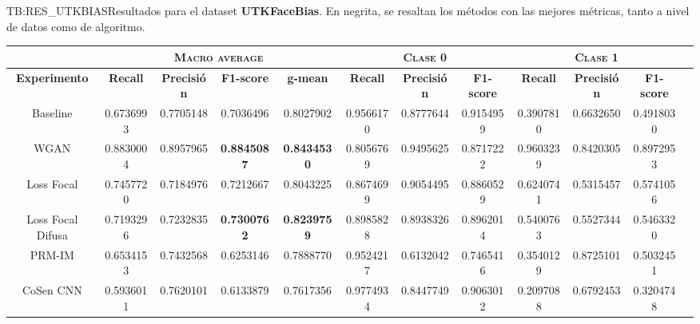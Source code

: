 \begin{landscape}
\begin{table}[Resultados UTKFaceBias]{TB:RES_UTKBIAS}{Resultados para el dataset \textbf{UTKFaceBias}. En negrita, se resaltan los métodos con las mejores métricas, tanto a nivel de datos como de algoritmo.}
    \small
    \begin{tabular}{|c|c|c|c|c|c|c|c|c|c|c|c|}
    \hline
         &  \multicolumn{4}{c|}{\textsc{Macro average}} & \multicolumn{3}{c|}{\textsc{Clase 0}} & \multicolumn{3}{c|}{\textsc{Clase 1}}\\ \hline
        \textbf{Experimento} & \textbf{Recall} & \textbf{Precisión} & \textbf{F1-score} & \textbf{g-mean} & \textbf{Recall} & \textbf{Precisión} & \textbf{F1-score} & \textbf{Recall} & \textbf{Precisión} & \textbf{F1-score} \\ \hline
        Baseline & 0.6736993 & 0.7705148 & 0.7036496 & 0.8027902 & 0.9566170 & 0.8777644 & 0.9154959 & 0.3907810 & 0.6632650 & 0.4918030 \\ \hline
        WGAN & 0.8830004 & 0.8957965 & \textbf{0.8845087} & \textbf{0.8434530} & 0.8056769 & 0.9495625 & 0.8717222 & 0.9603239 & 0.8420305 & 0.8972953 \\ \hline
        Loss Focal & 0.7457720 & 0.7184976 & 0.7212667 & 0.8043225 & 0.8674699 & 0.9054495 & 0.8860529 & 0.6240741 & 0.5315457 & 0.5741056 \\ \hline
        Loss Focal Difusa & 0.7193296 & 0.7232835 & \textbf{0.7300762} & \textbf{0.8239759} & 0.8985828 & 0.8938326 & 0.8962014 & 0.5400763 & 0.5527344 & 0.5463320 \\ \hline
        PRM-IM & 0.6534153 & 0.7432568 & 0.6253146 & 0.7888770 & 0.9524217 & 0.6132042 & 0.7465416 & 0.3540129 & 0.8725101 & 0.5032451 \\ \hline
        CoSen CNN & 0.5936011 & 0.7620101 & 0.6133879 & 0.7617356 & 0.9774934 & 0.8447749 & 0.9063012 & 0.2097088 & 0.6792453 & 0.3204748 \\ \hline
    \end{tabular}
\end{table}
\end{landscape}

